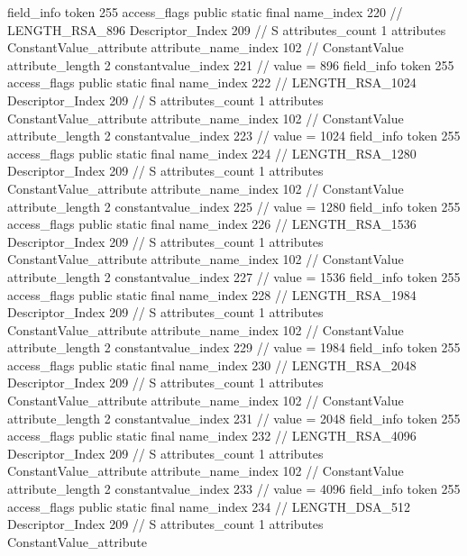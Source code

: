 {{{{{{{				}
				}
			}
			field_info {
				token	255
				access_flags	public static final
				name_index	220		// LENGTH_RSA_896
				Descriptor_Index	209		// S
				attributes_count	1
				attributes {
				ConstantValue_attribute {
					attribute_name_index	102		// ConstantValue
					attribute_length	2
					constantvalue_index	221		// value = 896
				}
				}
			}
			field_info {
				token	255
				access_flags	public static final
				name_index	222		// LENGTH_RSA_1024
				Descriptor_Index	209		// S
				attributes_count	1
				attributes {
				ConstantValue_attribute {
					attribute_name_index	102		// ConstantValue
					attribute_length	2
					constantvalue_index	223		// value = 1024
				}
				}
			}
			field_info {
				token	255
				access_flags	public static final
				name_index	224		// LENGTH_RSA_1280
				Descriptor_Index	209		// S
				attributes_count	1
				attributes {
				ConstantValue_attribute {
					attribute_name_index	102		// ConstantValue
					attribute_length	2
					constantvalue_index	225		// value = 1280
				}
				}
			}
			field_info {
				token	255
				access_flags	public static final
				name_index	226		// LENGTH_RSA_1536
				Descriptor_Index	209		// S
				attributes_count	1
				attributes {
				ConstantValue_attribute {
					attribute_name_index	102		// ConstantValue
					attribute_length	2
					constantvalue_index	227		// value = 1536
				}
				}
			}
			field_info {
				token	255
				access_flags	public static final
				name_index	228		// LENGTH_RSA_1984
				Descriptor_Index	209		// S
				attributes_count	1
				attributes {
				ConstantValue_attribute {
					attribute_name_index	102		// ConstantValue
					attribute_length	2
					constantvalue_index	229		// value = 1984
				}
				}
			}
			field_info {
				token	255
				access_flags	public static final
				name_index	230		// LENGTH_RSA_2048
				Descriptor_Index	209		// S
				attributes_count	1
				attributes {
				ConstantValue_attribute {
					attribute_name_index	102		// ConstantValue
					attribute_length	2
					constantvalue_index	231		// value = 2048
				}
				}
			}
			field_info {
				token	255
				access_flags	public static final
				name_index	232		// LENGTH_RSA_4096
				Descriptor_Index	209		// S
				attributes_count	1
				attributes {
				ConstantValue_attribute {
					attribute_name_index	102		// ConstantValue
					attribute_length	2
					constantvalue_index	233		// value = 4096
				}
				}
			}
			field_info {
				token	255
				access_flags	public static final
				name_index	234		// LENGTH_DSA_512
				Descriptor_Index	209		// S
				attributes_count	1
				attributes {
				ConstantValue_attribute {
}}}}}}}
